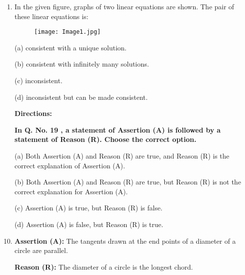 \documentclass[12pt,-letter paper]{article}
\begin{document}
\begin{enumerate}
\item In the given figure, graphs of two linear equations are shown. The pair of these linear equations is:
\begin{figure}[!ht]
\centering
\texttt{[image: Image1.jpg]}
\label{fig:enter-label}
\end{figure}

    \item[(a)] consistent with a unique solution.
    \item[(b)] consistent with infinitely many solutions.
    \item[(c)] inconsistent.
    \item[(d)] inconsistent but can be made consistent.


\textbf{Directions:}

\textbf{In Q. No. 19 , a statement of Assertion (A) is followed by a statement of Reason (R). Choose the correct option.}

    \item[(a)] Both Assertion (A) and Reason (R) are true, and Reason (R) is the correct explanation of Assertion (A).
    \item[(b)] Both Assertion (A) and Reason (R) are true, but Reason (R) is not the correct explanation for Assertion (A).
    \item[(c)] Assertion (A) is true, but Reason (R) is false.
    \item[(d)] Assertion (A) is false, but Reason (R) is true.
\item \textbf{Assertion (A):} The tangents drawn at the end points of a diameter of a circle are parallel.

\textbf{Reason (R):} The diameter of a circle is the longest chord.


\end{enumerate}
\end{document}

